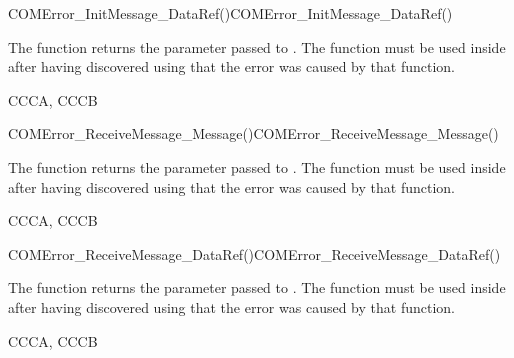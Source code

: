 \begin{function_nopb2}{COMError\_InitMessage\_DataRef()}{COMError_InitMessage_DataRef()}
  \begin{fundescription}
    The function returns the  parameter passed to
    . The function must be used inside  
     after having discovered using  that the error 
     was caused by that function.
  \end{fundescription}
  \begin{funreturn}
  \end{funreturn}
  \begin{funconformance}
   CCCA, CCCB
  \end{funconformance}
\end{function_nopb2}

\begin{function_nopb2}{COMError\_ReceiveMessage\_Message()}{COMError_ReceiveMessage_Message()}
  \begin{fundescription}
    The function returns the  parameter passed to
    . The function must be used inside  
     after having discovered using  that the error 
     was caused by that function.
  \end{fundescription}
  \begin{funreturn}
  \end{funreturn}
  \begin{funconformance}
   CCCA, CCCB
  \end{funconformance}
\end{function_nopb2}

\begin{function_nopb2}{COMError\_ReceiveMessage\_DataRef()}{COMError_ReceiveMessage_DataRef()}
  \begin{fundescription}
    The function returns the  parameter passed to
    . The function must be used inside  
     after having discovered using  that the error 
     was caused by that function.
  \end{fundescription}
  \begin{funreturn}
  \end{funreturn}
  \begin{funconformance}
   CCCA, CCCB
  \end{funconformance}
\end{function_nopb2}

